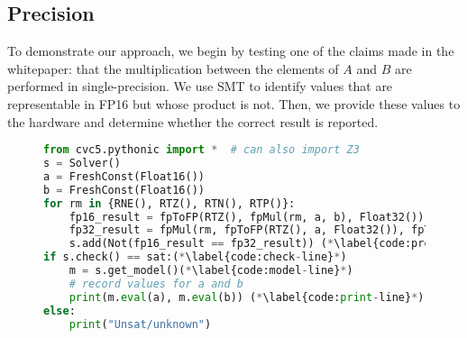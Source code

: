 \subsection{Precision}
To demonstrate our approach, we begin by testing one of the claims made in the whitepaper: that the multiplication between the elements of $A$ and $B$ are performed in single-precision. We use SMT to identify values that are representable in FP16 but whose product is not.  Then, we provide these values to the hardware and determine whether the correct result is reported.

\begin{figure}[!t]
\begin{lstlisting}[style=mystyle, language=Python,label={lst:example-proof},caption={The python script showing how to use cvc5's (or Z3's) python api to identify a pair of half-precision values whose product is not exact when the multiplication is performed in half-precision.}]
from cvc5.pythonic import *  # can also import Z3
s = Solver()
a = FreshConst(Float16())
b = FreshConst(Float16())
for rm in {RNE(), RTZ(), RTN(), RTP()}:
    fp16_result = fpToFP(RTZ(), fpMul(rm, a, b), Float32()) (*\label{code:fp16-line}*)
    fp32_result = fpMul(rm, fpToFP(RTZ(), a, Float32()), fpToFP(RTZ(), b, Float32()) (*\label{code:fp32-line}*)
    s.add(Not(fp16_result == fp32_result)) (*\label{code:proof-line}*)
if s.check() == sat:(*\label{code:check-line}*)
    m = s.get_model()(*\label{code:model-line}*)
    # record values for a and b
    print(m.eval(a), m.eval(b)) (*\label{code:print-line}*)
else:
    print("Unsat/unknown")
\end{lstlisting}
\end{figure}

